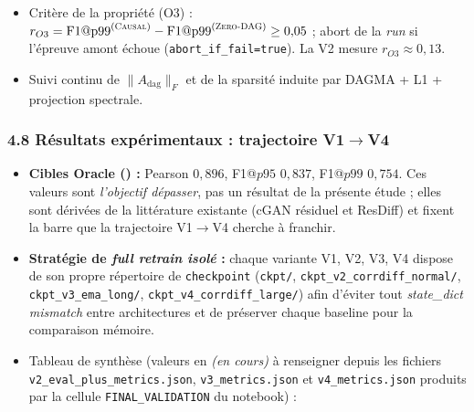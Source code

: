 \documentclass[12pt,a4paper]{article}
\begin{document}
\begin{itemize}
    \item Crit\`ere de la propri\'et\'e (O3) : $r_{O3} = \mathrm{F1@p99}^{(\textsc{Causal})} - \mathrm{F1@p99}^{(\textsc{Zero-DAG})} \geq 0{,}05$ ; abort de la \emph{run} si l'\'epreuve amont \'echoue (\texttt{abort\_if\_fail=true}). La V2 mesure $r_{O3} \approx 0{,}13$.
    \item Suivi continu de $\|A_{\mathrm{dag}}\|_F$ et de la sparsit\'e induite par DAGMA + L1 + projection spectrale.
\end{itemize}

\subsubsection*{4.8 R\'esultats exp\'erimentaux : trajectoire V1$\rightarrow$V4}
\begin{itemize}
    \item \textbf{Cibles Oracle (\citep{Mardani2024ResDiff, Rampal2024cGAN, Mardani2025CorrDiff}) :} Pearson $0{,}896$, F1@$p95$ $0{,}837$, F1@$p99$ $0{,}754$. Ces valeurs sont \emph{l'objectif d\'epasser}, pas un r\'esultat de la pr\'esente \'etude ; elles sont d\'eriv\'ees de la litt\'erature existante (cGAN r\'esiduel et ResDiff) et fixent la barre que la trajectoire V1$\rightarrow$V4 cherche \`a franchir.
    \item \textbf{Strat\'egie de \emph{full retrain isol\'e} :} chaque variante V1, V2, V3, V4 dispose de son propre r\'epertoire de \texttt{checkpoint} (\texttt{ckpt/}, \texttt{ckpt\_v2\_corrdiff\_normal/}, \texttt{ckpt\_v3\_ema\_long/}, \texttt{ckpt\_v4\_corrdiff\_large/}) afin d'\'eviter tout \emph{state\_dict mismatch} entre architectures et de pr\'eserver chaque baseline pour la comparaison m\'emoire.
    \item Tableau de synth\`ese (valeurs en \emph{(en cours)} \`a renseigner depuis les fichiers \texttt{v2\_eval\_plus\_metrics.json}, \texttt{v3\_metrics.json} et \texttt{v4\_metrics.json} produits par la cellule \texttt{FINAL\_VALIDATION} du notebook) :


\end{itemize}
\end{document}

